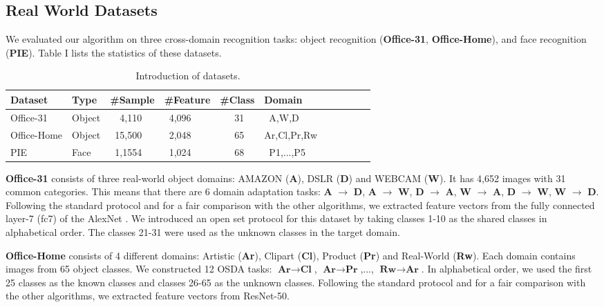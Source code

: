 \documentclass[journal]{IEEEtran}
\begin{document}
\subsection{Real World Datasets}
We evaluated our algorithm on three cross-domain  recognition tasks: object recognition (\textbf{Office-31}, \textbf{Office-Home}), and face recognition (\textbf{PIE}). Table I lists the statistics of these datasets.
\begin{table}[h]
\scriptsize
\caption{{Introduction of datasets.}}
\begin{center}
\begin{tabular}{p{1.3cm}lp{1cm}lp{1cm} lp{1cm}lp{1cm}lp{1cm}}
\hline \hline
Dataset  &Type&\#Sample& \#Feature&\#Class & Domain   \\ \hline
Office-31  &Object&~~4,110&~4,096&~~~31&~A,W,D \\ 
Office-Home  &Object&~15,500&~2,048&~~~65&Ar,Cl,Pr,Rw\\ 
PIE   &Face&~1,1554&~1,024&~~~68&~P1,...,P5\\
\hline
\hline
\end{tabular}
\end{center}
\end{table}

\textbf{Office-31} \cite{DBLP:conf/eccv/SaenkoKFD10} consists of three real-world object domains: AMAZON (\textbf{A}), DSLR (\textbf{D}) and WEBCAM (\textbf{W}). It has 4,652 images with 31 common categories. This means that there are 6 domain adaptation tasks: \textbf{A} $\rightarrow$ \textbf{D}, \textbf{A} $\rightarrow$ \textbf{W}, \textbf{D} $\rightarrow$ \textbf{A}, \textbf{W} $\rightarrow$ \textbf{A}, \textbf{D} $\rightarrow$ \textbf{W}, \textbf{W} $\rightarrow$ \textbf{D}. Following the standard protocol and for a fair comparison with the other algorithms, we extracted feature vectors from the fully connected layer-7 (fc7) of the AlexNet \cite{DBLP:conf/nips/KrizhevskySH12}.
We introduced an open set protocol for this dataset by taking classes 1-10 as the shared classes in alphabetical order. The classes 21-31 were used as the unknown classes in the target domain. 

\textbf{Office-Home} \cite{DBLP:conf/cvpr/VenkateswaraECP17} consists of 4 different domains: Artistic (\textbf{Ar}), Clipart (\textbf{Cl}), Product (\textbf{Pr}) and Real-World (\textbf{Rw}).  Each domain contains images from 65 object classes. We constructed 12 OSDA tasks: $\textbf{Ar}\rightarrow \textbf{Cl}$, $\textbf{Ar}\rightarrow \textbf{Pr}$,..., $\textbf{Rw}\rightarrow \textbf{Ar}$. In alphabetical order, we used the first 25 classes as the known classes and classes 26-65 as the unknown classes. Following the standard protocol and for a fair comparison with  the other  algorithms, we extracted feature vectors from ResNet-50. 
\end{document}
